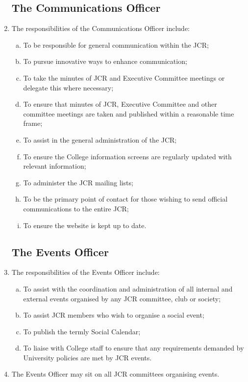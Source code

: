 \documentclass[12pt]{article}  %
\begin{document}
\begin{enumerate}
    \subsection{The Communications Officer}
    \item The responsibilities of the Communications Officer include:
    \begin{enumerate}[(a)]
        \item To be responsible for general communication within the JCR;
        \item To pursue innovative ways to enhance communication;
        \item To take the minutes of JCR and Executive Committee meetings or delegate this where necessary;
        \item To ensure that minutes of JCR, Executive Committee and other committee meetings are taken and published within a reasonable time frame;
        \item To assist in the general administration of the JCR;
        \item To ensure the College information screens are regularly updated with relevant information;
        \item To administer the JCR mailing lists;
        \item To be the primary point of contact for those wishing to send official communications to the entire JCR;
        \item To ensure the website is kept up to date.
    \end{enumerate}
    \subsection{The Events Officer}
    \item The responsibilities of the Events Officer include:
    \begin{enumerate}[(a)]
        \item To assist with the coordination and administration of all internal and external events organised by any JCR committee, club or society;
        \item To assist JCR members who wish to organise a social event;
        \item To publish the termly Social Calendar;
        \item To liaise with College staff to ensure that any requirements demanded by University policies are met by JCR events.
    \end{enumerate}
    \item The Events Officer may sit on all JCR committees organising events.

\end{enumerate}
\end{document}
